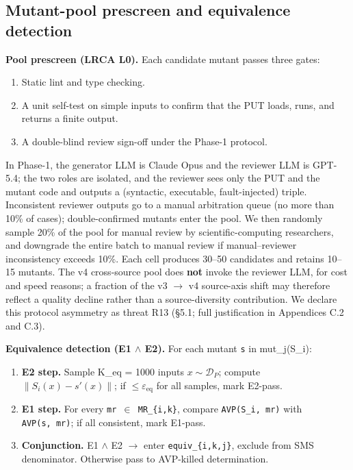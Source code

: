 \documentclass[manuscript,screen,review]{acmart}
\begin{document}
\subsection{Mutant-pool prescreen and equivalence detection}\label{mutant-pool-prescreen-and-equivalence-detection}

\textbf{Pool prescreen (LRCA L0).} Each candidate mutant passes three
gates:
\begin{enumerate}

\item Static lint and type checking.
\item A unit self-test on simple inputs to confirm that the PUT loads,
  runs, and returns a finite output.
\item A double-blind review sign-off under the Phase-1 protocol.
\end{enumerate} In Phase-1, the generator LLM is Claude Opus and the reviewer
LLM is GPT-5.4; the two roles are isolated, and the reviewer sees only
the PUT and the mutant code and outputs a (syntactic, executable,
fault-injected) triple. Inconsistent reviewer outputs go to a manual
arbitration queue (no more than 10\% of cases); double-confirmed mutants
enter the pool. We then randomly sample 20\% of the pool for manual
review by scientific-computing researchers, and downgrade the entire
batch to manual review if manual--reviewer inconsistency exceeds 10\%.
Each cell produces 30--50 candidates and retains 10--15 mutants. The v4
cross-source pool does \textbf{not} invoke the reviewer LLM, for cost
and speed reasons; a fraction of the v3 $\to$ v4 source-axis shift may
therefore reflect a quality decline rather than a source-diversity
contribution. We declare this protocol asymmetry as threat R13 (§5.1;
full justification in Appendices C.2 and C.3).

\textbf{Equivalence detection (E1 $\wedge$ E2).} For each mutant
\texttt{s\textquotesingle{}} in mut\_j(S\_i):

\begin{enumerate}[label=(\alph*)]

\item
  \textbf{E2 step.} Sample K\_eq = 1000 inputs
  $x \sim \mathcal{D}_P$; compute
  $\|S_i(x) - s'(x)\|$; if $\leq \varepsilon_{\mathrm{eq}}$ for all
  samples, mark E2-pass.
\item
  \textbf{E1 step.} For every \texttt{mr\ $\in$\ MR\_\{i,k\}}, compare
  \texttt{AVP(S\_i,\ mr)} with \texttt{AVP(s\textquotesingle{},\ mr)};
  if all consistent, mark E1-pass.
\item
  \textbf{Conjunction.} E1 $\wedge$ E2 $\to$ enter \texttt{equiv\_\{i,k,j\}},
  exclude from SMS denominator. Otherwise pass to AVP-killed
  determination.
\end{enumerate}
\end{document}
